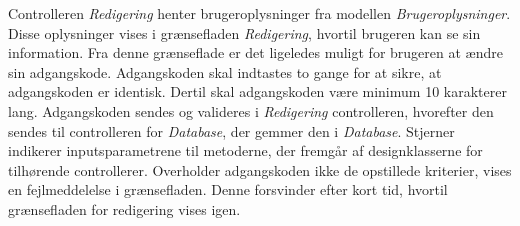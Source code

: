 \noindent
Controlleren \textit{Redigering} henter brugeroplysninger fra modellen \textit{Brugeroplysninger}. Disse oplysninger vises i grænsefladen \textit{Redigering}, hvortil brugeren kan se sin information. Fra denne grænseflade er det ligeledes muligt for brugeren at ændre sin adgangskode. Adgangskoden skal indtastes to gange for at sikre, at adgangskoden er identisk. Dertil skal adgangskoden være minimum 10 karakterer lang. Adgangskoden sendes og valideres i \textit{Redigering} controlleren, hvorefter den sendes til controlleren for \textit{Database}, der gemmer den i \textit{Database}. Stjerner indikerer inputsparametrene til metoderne, der fremgår af designklasserne for tilhørende controllerer. Overholder adgangskoden ikke de opstillede kriterier, vises en fejlmeddelelse i grænsefladen. Denne forsvinder efter kort tid, hvortil grænsefladen for redigering vises igen. 
